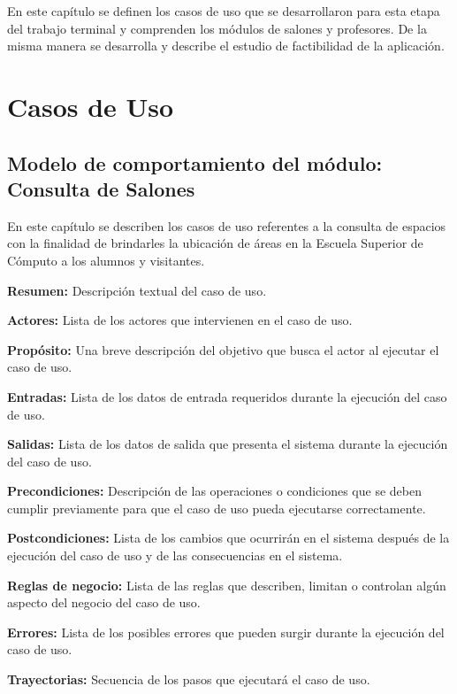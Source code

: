 En este capítulo se definen los casos de uso que se desarrollaron para esta etapa del trabajo terminal y comprenden los módulos de salones y profesores. De la misma manera se desarrolla y describe el estudio de factibilidad de la aplicación.
\newpage
\section{Casos de Uso}
\subsection{Modelo de comportamiento del módulo: Consulta de Salones \label{chp:modeloComportamientoProfesores}}
En este capítulo se describen los casos de uso referentes a la consulta de espacios con la finalidad de brindarles la ubicación de áreas en la Escuela Superior de Cómputo a los alumnos y visitantes. \bigskip

\begin{objetivos}
	\item {\bf Resumen:} Descripción textual del caso de uso.
	\item {\bf Actores:} Lista de los actores que intervienen en el caso de uso.
	\item {\bf Propósito:} Una breve descripción del objetivo que busca el actor al ejecutar el caso de uso.
	\item {\bf Entradas:} Lista de los datos de entrada requeridos durante la ejecución del caso de uso.
	\item {\bf Salidas:} Lista de los datos de salida que presenta el sistema durante la ejecución del caso de uso.
	\item {\bf Precondiciones:} Descripción de las operaciones o condiciones que se deben cumplir previamente para que el caso de uso pueda ejecutarse correctamente.
	\item {\bf Postcondiciones:} Lista de los cambios que ocurrirán en el sistema después de la ejecución del caso de uso y de las consecuencias en el sistema.
	\item {\bf Reglas de negocio:} Lista de las reglas que describen, limitan o controlan algún aspecto del negocio del caso de uso.
	\item {\bf Errores:} Lista de los posibles errores que pueden surgir durante la ejecución del caso de uso.
	\item {\bf Trayectorias:} Secuencia de los pasos que ejecutará el caso de uso.
\end{objetivos}

